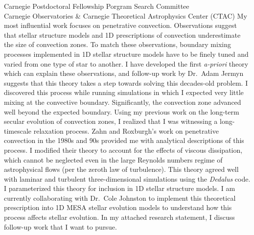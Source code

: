 \documentclass[12pt]{letter}
\begin{document}
\begin{letter}{
               Carnegie Postdoctoral Fellowship Porgram Search Committee \\
               Carnegie Observatories \& Carnegie Theoretical Astrophysics Center (CTAC)
           }
    My most influential work focuses on penetrative convection.
    Observations suggest that stellar structure models and 1D prescriptions of convection underestimate the size of convection zones.
    To match these observations, boundary mixing processes implemented in 1D stellar structure models have to be finely tuned and varied from one type of star to another.
    I have developed the first \emph{a-priori} theory which can explain these observations, and follow-up work by Dr.~Adam Jermyn suggests that this theory takes a step towards solving this decades-old problem.
    I discovered this process while running simulations in which I expected very little mixing at the convective boundary.
    Significantly, the convection zone advanced well beyond the expected boundary.
    Using my previous work on the long-term secular evolution of convection zones, I realized that I was witnessing a long-timescale relaxation process.
    Zahn and Roxburgh's work on penetrative convection in the 1980s and 90s provided me with analytical descriptions of this process.
    I modified their theory to account for the effects of viscous dissipation, which cannot be neglected even in the large Reynolds numbers regime of astrophysical flows (per the zeroth law of turbulence).
    This theory agreed well with laminar and turbulent three-dimensional simulations using the \emph{Dedalus} code.
    I parameterized this theory for inclusion in 1D stellar structure models.
    I am currently collaborating with Dr.~Cole Johnston to implement this theoretical prescription into 1D MESA stellar evolution models to understand how this process affects stellar evolution.
    In my attached research statement, I discuss follow-up work that I want to pursue.


\end{letter}
\end{document}
